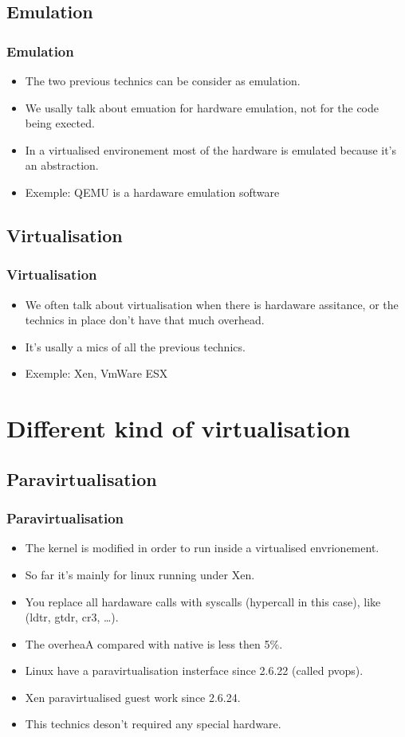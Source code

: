 \subsection{Emulation}
\begin{frame}
\frametitle{Emulation}
\begin{itemize}
\item The two previous technics can be consider as emulation.
\item We usally talk about emuation for hardware emulation, not
for the code being exected.
\item In a virtualised environement most of the hardware is emulated
because it's an abstraction.
\item Exemple: QEMU is a hardaware emulation software
\end{itemize}
\end{frame}

\subsection{Virtualisation}
\begin{frame}
\frametitle{Virtualisation}
\begin{itemize}
\item We often talk about virtualisation when there is hardaware
assitance, or the technics in place don't have that much overhead.
\item It's usally a mics of all the previous technics.
\item Exemple: Xen, VmWare ESX
\end{itemize}
\end{frame}

\section{Different kind of virtualisation}
\subsection{Paravirtualisation}
\begin{frame}
\frametitle{Paravirtualisation}
\begin{itemize}
\item The kernel is modified in order to run inside a virtualised
envrionement.
\item So far it's mainly for linux running under Xen.
\item You replace all hardaware calls with syscalls (hypercall in this
case), like (ldtr, gtdr, cr3, \ldots ).
\item The overheaA compared with native is less then 5\%.
\item Linux have a paravirtualisation insterface since 2.6.22 (called
pvops).
\item Xen paravirtualised guest work since 2.6.24.
\item This technics deson't required any special hardware.
\end{itemize}
\end{frame}

